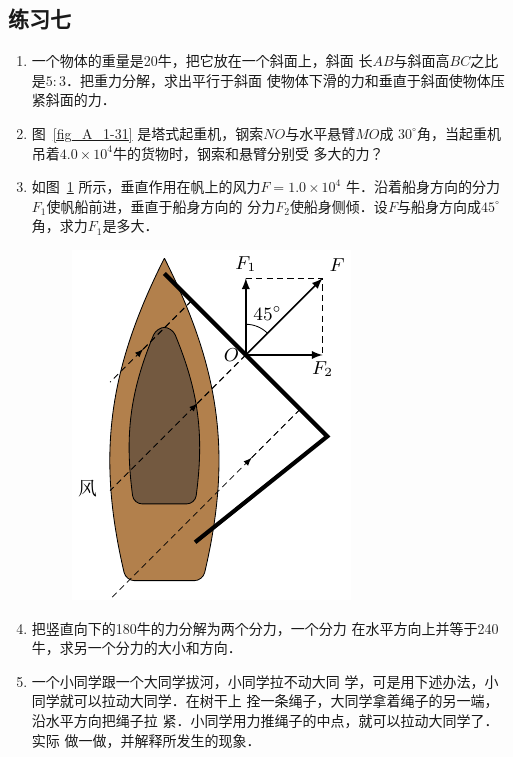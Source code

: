 \subsection*{练习七} 
\begin{enumerate} 

\item 一个物体的重量是20牛，把它放在一个斜面上，斜面
长$AB$与斜面高$BC$之比是$5:3$．把重力分解，求出平行于斜面
使物体下滑的力和垂直于斜面使物体压紧斜面的力．
 


\item 图~\ref{fig_A_1-31} 是塔式起重机，钢索$NO$与水平悬臂$MO$成
$30^\circ$角，当起重机吊着$4.0\times 10^4$牛的货物时，钢索和悬臂分别受
多大的力？
\item 如图~\ref{fig_A_1-32} 所示，垂直作用在帆上的风力$F=1.0\times 10^4$
牛．沿着船身方向的分力$F_1$使帆船前进，垂直于船身方向的
分力$F_2$使船身侧倾．设$F$与船身方向成$45^\circ$角，求力$F_1$是多大．
\begin{figure}[htbp]
    \centering
    \includegraphics{fig/A/1-32.pdf} 
    \caption{} \label{fig_A_1-32} 
\end{figure} 

\item 把竖直向下的180牛的力分解为两个分力，一个分力
在水平方向上并等于240牛，求另一个分力的大小和方向．

\item 一个小同学跟一个大同学拔河，小同学拉不动大同
学，可是用下述办法，小同学就可以拉动大同学．在树干上
拴一条绳子，大同学拿着绳子的另一端，沿水平方向把绳子拉
紧．小同学用力推绳子的中点，就可以拉动大同学了．实际
做一做，并解释所发生的现象．

\end{enumerate} 

